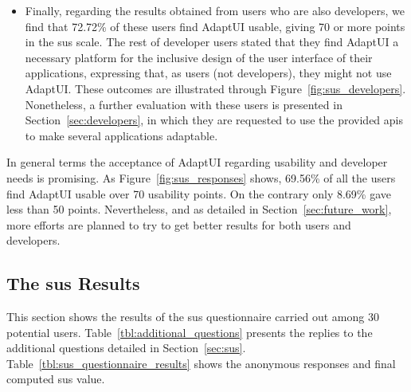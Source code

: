 \begin{itemize}
  \item Finally, regarding the results obtained from users who are also 
  developers, we find that 72.72\% of these users find AdaptUI usable, 
  giving 70 or more points in the \ac{sus} scale. The rest of developer users 
  stated that they find AdaptUI a necessary platform for the inclusive design of 
  the user interface of their applications, expressing that, as users (not 
  developers), they might not use AdaptUI. These outcomes are illustrated
  through Figure~\ref{fig:sus_developers}. Nonetheless, a further evaluation
  with these users is presented in Section~\ref{sec:developers}, in which they
  are requested to use the provided \acp{api} to make several applications
  adaptable.
\end{itemize}

In general terms the acceptance of AdaptUI regarding usability and developer
needs is promising. As Figure~\ref{fig:sus_responses} shows, 69.56\% of all 
the users find AdaptUI usable over 70 usability points. On the contrary only
8.69\% gave less than 50 points. Nevertheless, and as detailed in 
Section~\ref{sec:future_work}, more efforts are planned to try to get better
results for both users and developers.

\subsection{The \ac{sus} Results}
\label{sec:sus_results}
 
This section shows the results of the \ac{sus} questionnaire carried out among
30 potential users. Table~\ref{tbl:additional_questions} presents the replies 
to the additional questions detailed in Section~\ref{sec:sus}.
Table~\ref{tbl:sus_questionnaire_results} shows the anonymous responses and final
computed \ac{sus} value.


